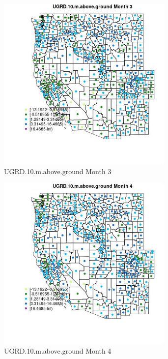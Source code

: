 \begin{figure} 
\centering  
\includegraphics[width=0.77\textwidth]{Code_Outputs/df_report_ML_predictors_CountyCentroid_Locations_Dates_2008-01-01to2018-12-31_MapObsMo3UGRD10maboveground.jpg} 
\caption{\label{fig:df_report_ML_predictors_CountyCentroid_Locations_Dates_2008-01-01to2018-12-31MapObsMo3UGRD10maboveground}UGRD.10.m.above.ground Month 3} 
\end{figure} 
 

\begin{figure} 
\centering  
\includegraphics[width=0.77\textwidth]{Code_Outputs/df_report_ML_predictors_CountyCentroid_Locations_Dates_2008-01-01to2018-12-31_MapObsMo4UGRD10maboveground.jpg} 
\caption{\label{fig:df_report_ML_predictors_CountyCentroid_Locations_Dates_2008-01-01to2018-12-31MapObsMo4UGRD10maboveground}UGRD.10.m.above.ground Month 4} 
\end{figure} 
 

